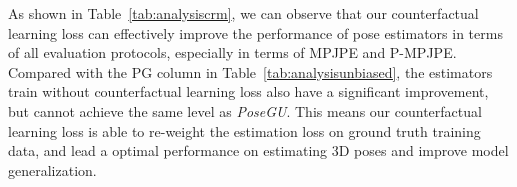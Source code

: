 \documentclass[runningheads]{llncs}
\begin{document}
\begin{table}[h]
	\small
	\centering
	\caption{Effective of counterfactual learning loss on \textit{PoseGU}. CL indicates the estimators trained within and without counterfactual learning loss respectively. Best results are shown in \textbf{bold}.}
	\label{tab:analysiscrm}
\end{table}

As shown in Table~\ref{tab:analysiscrm}, we can observe that our counterfactual learning loss can effectively improve the performance of pose estimators in terms of all evaluation protocols, especially in terms of MPJPE and P-MPJPE.
Compared with the PG column in Table~\ref{tab:analysisunbiased}, the estimators train without counterfactual learning loss also have a significant improvement, but cannot achieve the same level as \textit{PoseGU}. 
This means our counterfactual learning loss is able to re-weight the estimation loss on ground truth training data, and lead a optimal performance on estimating 3D poses and improve model generalization. 
\end{document}
